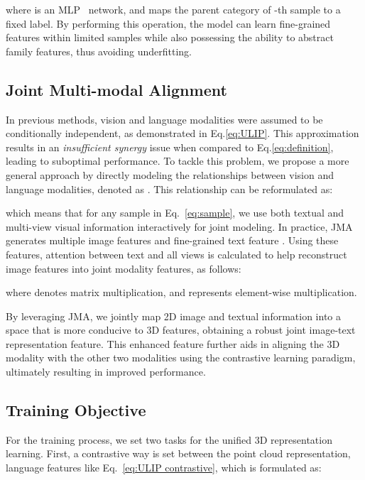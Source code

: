 \documentclass[sigconf]{acmart}
\begin{document}
where  is an MLP~\cite{tolstikhin2021mlp} network, and  maps the parent category of -th sample to a fixed label. By performing this operation, the model can learn fine-grained features within limited samples while also possessing the ability to abstract family features, thus avoiding underfitting.









\subsection{Joint Multi-modal Alignment \label{sec:JMA}}
In previous methods, vision and language modalities were assumed to be conditionally independent, as demonstrated in Eq.\ref{eq:ULIP}. This approximation results in an \emph{insufficient synergy} issue when compared to Eq.\ref{eq:definition}, leading to suboptimal performance. To tackle this problem, we propose a more general approach by directly modeling the relationships between vision and language modalities, denoted as . This relationship can be reformulated as:

which means that for any sample  in Eq.~\ref{eq:sample}, we use both textual and multi-view visual information interactively for joint modeling. In practice, JMA generates multiple image features  and fine-grained text feature . Using these features, attention between text and all views is calculated to help reconstruct image features into joint modality features, as follows:

where  denotes matrix multiplication, and  represents element-wise multiplication.

By leveraging JMA, we jointly map 2D image and textual information into a space that is more conducive to 3D features, obtaining a robust joint image-text representation feature. This enhanced feature further aids in aligning the 3D modality with the other two modalities using the contrastive learning paradigm, ultimately resulting in improved performance.

\subsection{Training Objective \label{sec:loss}}

For the training process, we set two tasks for the unified 3D representation learning. First, a contrastive way is set between the point cloud representation, language features like Eq.~\ref{eq:ULIP contrastive}, which is formulated as:
\end{document}
